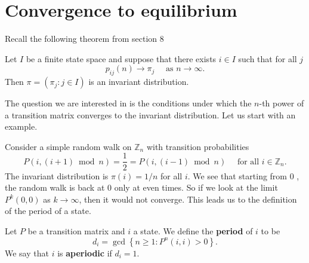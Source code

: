 \documentclass[a4paper,11pt]{article}
\begin{document}
\section{Convergence to equilibrium}
Recall the following theorem from section 8 
\begin{theorem}
    Let $I$ be a finite state space and suppose that there exists $i \in I$ such that for all $j$
    \[
    p_{i j}(n) \rightarrow \pi_j \quad \text { as } n \rightarrow \infty .
    \]
    Then $\pi=\left(\pi_j: j \in I\right)$ is an invariant distribution.
\end{theorem}
The question we are interested in is the conditions under which the $n$-th power of a transition matrix converges to the invariant distribution. Let us start with an example.

Consider a simple random walk on $\mathbb{Z}_n$ with transition probabilities
\[
P(i,(i+1) \bmod n)=\frac{1}{2}=P(i,(i-1) \bmod n) \quad \text { for all } i \in \mathbb{Z}_n .
\]
The invariant distribution is $\pi(i)=1 / n$ for all $i$. We see that starting from 0 , the random walk is back at 0 only at even times. So if we look at the limit $P^k(0,0)$ as $k \rightarrow \infty$, then it would not converge. This leads us to the definition of the period of a state.

\begin{definition}
    Let $P$ be a transition matrix and $i$ a state. We define the \textbf{period} of $i$ to be
    \[
    d_i=\gcd\left\{n \geq 1: P^n(i, i)>0\right\} .
    \]
    We say that $i$ is \textbf{aperiodic} if $d_i=1$.
\end{definition}
\end{document}
